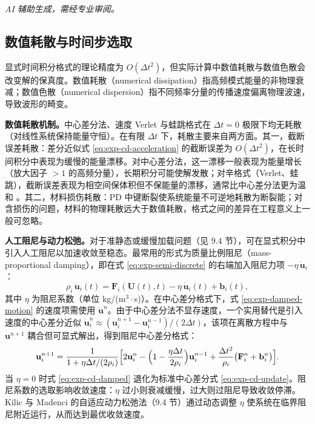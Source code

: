 \emph{AI 辅助生成，需经专业审阅。}

\subsection{数值耗散与时间步选取}\label{sec:disc-dissipation}

显式时间积分格式的理论精度为 $O(\Delta t^{2})$，但实际计算中数值耗散与数值色散会改变解的保真度。数值耗散（numerical dissipation）指高频模式能量的非物理衰减；数值色散（numerical dispersion）指不同频率分量的传播速度偏离物理波速，导致波形的畸变。

\textbf{数值耗散机制。}中心差分法、速度 Verlet 与蛙跳格式在 $\Delta t=0$ 极限下均无耗散（对线性系统保持能量守恒）。在有限 $\Delta t$ 下，耗散主要来自两方面。其一，截断误差耗散：差分近似式 \eqref{eq:exp-cd-acceleration} 的截断误差为 $O(\Delta t^{2})$，在长时间积分中表现为缓慢的能量漂移。对中心差分法，这一漂移一般表现为能量增长（放大因子 $>1$ 的高频分量），长期积分可能使解发散；对辛格式（Verlet、蛙跳），截断误差表现为相空间保体积但不保能量的漂移，通常比中心差分法更为温和 \cite{BelytschkoLiuMoran2000}。其二，材料损伤耗散：PD 中键断裂使系统能量不可逆地耗散为断裂能；对含损伤的问题，材料的物理耗散远大于数值耗散，格式之间的差异在工程意义上一般可忽略。

\textbf{人工阻尼与动力松弛。}对于准静态或缓慢加载问题（见 9.4 节），可在显式积分中引入人工阻尼以加速收敛至稳态。最常用的形式为质量比例阻尼（mass-proportional damping），即在式 \eqref{eq:exp-semi-discrete} 的右端加入阻尼力项 $-\eta\,\dot{\mathbf{u}}_i$：
\begin{equation}
  \rho_i\,\ddot{\mathbf{u}}_i(t)
  =\mathbf{F}_i(\mathbf{U}(t),t)
  -\eta\,\dot{\mathbf{u}}_i(t)
  +\mathbf{b}_i(t),
  \label{eq:exp-damped-motion}
\end{equation}
其中 $\eta$ 为阻尼系数（单位 kg/(m$^3\cdot$s)）。在中心差分格式下，式 \eqref{eq:exp-damped-motion} 的速度项需使用 $\dot{\mathbf{u}}^{n}$。由于中心差分法不显存速度，一个实用替代是引入速度的中心差分近似 $\dot{\mathbf{u}}_i^{n}\approx(\mathbf{u}_i^{n+1}-\mathbf{u}_i^{n-1})/(2\Delta t)$，该项在离散方程中与 $\mathbf{u}^{n+1}$ 耦合但可显式解出，得到阻尼中心差分格式：
\begin{equation}
  \mathbf{u}_i^{n+1}
  =\frac{1}{1+\eta\Delta t/(2\rho_i)}
  \Bigl[
  2\mathbf{u}_i^{n}
  -\Bigl(1-\frac{\eta\Delta t}{2\rho_i}\Bigr)\mathbf{u}_i^{n-1}
  +\frac{\Delta t^{2}}{\rho_i}
  \bigl(\mathbf{F}_i^{n}+\mathbf{b}_i^{n}\bigr)
  \Bigr].
  \label{eq:exp-cd-damped}
\end{equation}
当 $\eta=0$ 时式 \eqref{eq:exp-cd-damped} 退化为标准中心差分式 \eqref{eq:exp-cd-update}。阻尼系数的选取影响收敛速度：$\eta$ 过小则衰减缓慢，过大则过阻尼导致收敛停滞。Kilic 与 Madenci \cite{KilicMadenci2010} 的自适应动力松弛法（9.4 节）通过动态调整 $\eta$ 使系统在临界阻尼附近运行，从而达到最优收敛速度。

